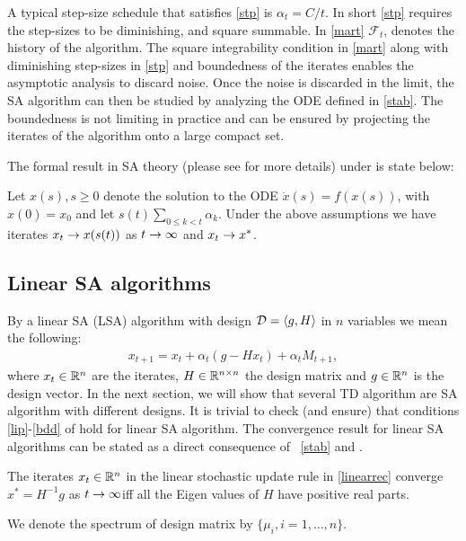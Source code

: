 A typical step-size schedule that satisfies \ref{stp} is $\alpha_t=C/t$. In short \ref{stp} requires the step-sizes to be diminishing, and square summable. In \ref{mart} $\mathcal{F}_t$, denotes the history of the algorithm. The square integrability condition in \ref{mart} along with diminishing step-sizes in \ref{stp} and boundedness of the iterates enables the asymptotic analysis to discard noise. Once the noise is discarded in the limit, the SA algorithm can then be studied by analyzing the ODE defined in \ref{stab}. The boundedness is not limiting in practice and can be ensured by projecting the iterates of the algorithm onto a large compact set.\par
The formal result in SA theory (please see \cite{SA} for more details) under  is state below:
\begin{theorem}\label{sat}
Let $x(s),s\geq 0$ denote the solution to the ODE $\dot{x}(s)=f(x(s))$, with $x(0)=x_0$ and let $s(t)\sum_{0\leq k< t}\alpha_k$. Under the above assumptions we have iterates $x_t\rightarrow x(s(t))$ as $t\rightarrow\infty$ and $x_t\rightarrow x^*$.
\end{theorem}
\subsection{Linear SA algorithms}
By a linear SA (LSA) algorithm with design $\mathcal{D}=\langle g,H\rangle$ in $n$ variables we mean the following:
\begin{align}\label{linearrec}
x_{t+1}=x_t+\alpha_t(g-Hx_t)+\alpha_t M_{t+1},
\end{align}
where $x_t\in \mathbb{R}^n$ are the iterates, $H\in \mathbb{R}^{n\times n}$ the design matrix and $g\in \mathbb{R}^n$ is the design vector. 
In the next section, we will show that several TD algorithm are SA algorithm with different designs. 
It is trivial to check (and ensure) that conditions \ref{lip}-\ref{bdd} of  hold for linear SA algorithm. The convergence result for linear SA algorithms can be stated as 
a direct consequence of ~\ref{stab} and .
\begin{corollary}\label{linstab}
The iterates $x_t\in \mathbb{R}^n$ in the linear stochastic update rule in \eqref{linearrec} converge $x^*=H^{-1}g$ as $t\rightarrow\infty $iff all the Eigen values of $H$ have positive real parts.
\end{corollary}
We denote the spectrum of design matrix by $\{\mu_i,i=1,\ldots,n\}$.
